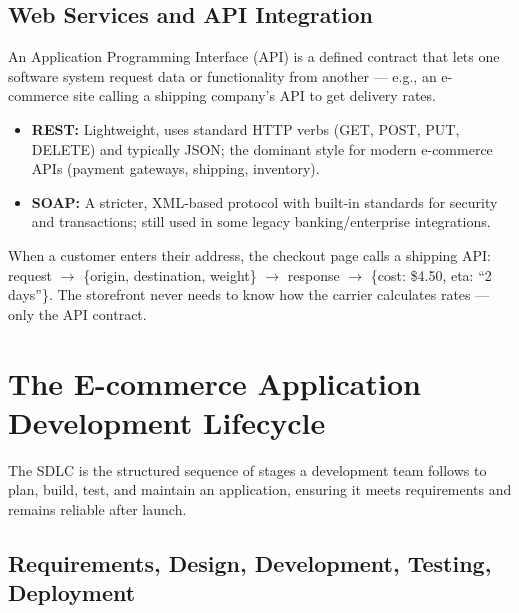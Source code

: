 \documentclass[11pt,a4paper]{article}
\begin{document}
\subsection{Web Services and API Integration}
\begin{definitionbox}[API]
An Application Programming Interface (API) is a defined contract that lets one software system request data or functionality from another --- e.g., an e-commerce site calling a shipping company's API to get delivery rates.
\end{definitionbox}

\begin{conceptbox}
\begin{itemize}[leftmargin=*]
  \item \textbf{REST:} Lightweight, uses standard HTTP verbs (GET, POST, PUT, DELETE) and typically JSON; the dominant style for modern e-commerce APIs (payment gateways, shipping, inventory).
  \item \textbf{SOAP:} A stricter, XML-based protocol with built-in standards for security and transactions; still used in some legacy banking/enterprise integrations.
\end{itemize}
\end{conceptbox}

\begin{examplebox}
When a customer enters their address, the checkout page calls a shipping API: request $\to$ \{origin, destination, weight\} $\to$ response $\to$ \{cost: \$4.50, eta: ``2 days''\}. The storefront never needs to know how the carrier calculates rates --- only the API contract.
\end{examplebox}

\section{The E-commerce Application Development Lifecycle}

\begin{definitionbox}
The SDLC is the structured sequence of stages a development team follows to plan, build, test, and maintain an application, ensuring it meets requirements and remains reliable after launch.
\end{definitionbox}

\subsection{Requirements, Design, Development, Testing, Deployment}
\end{document}
